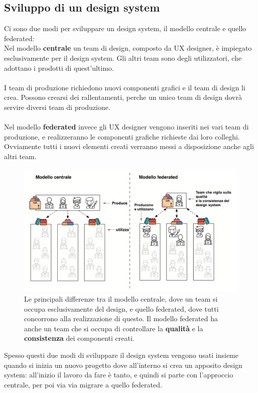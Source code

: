 \subsection{Sviluppo di un design system}
Ci sono due modi per sviluppare un design system, il modello centrale e quello federated:
\\
Nel modello \textbf{centrale} un team di design, composto da UX designer, è impiegato esclusivamente per il design system. Gli altri team sono degli utilizzatori, che adottano i
 prodotti di quest'ultimo.
\\\\
I team di produzione richiedono nuovi componenti grafici e il team di design li crea. 
Possono crearsi dei rallentamenti, perche un unico team di design dovrà servire diversi team di produzione.
\\\\
Nel modello \textbf{federated} invece gli UX designer vengono inseriti nei vari team di produzione, e realizzeranno le componenti grafiche richieste dai loro colleghi. 
Ovviamente tutti i nuovi elementi creati verranno messi a disposizione anche agli altri team.
\begin{figure}[H]
    \centering
    \includegraphics[width=148mm]{img/design system}
    \caption{Le principali differenze tra il modello centrale, dove un team si occupa esclusivamente del design, e
    quello federated, dove tutti concorrono alla realizzazione di questo. Il modello federated ha anche un team che si occupa di controllare la \textbf{qualità} e la 
    \textbf{consistenza} dei componenti creati.}
  \end{figure}
Spesso questi due modi di sviluppare il design system vengono usati insieme quando si inizia un nuovo progetto dove 
all'interno si crea un apposito design system: all’inizio il lavoro da fare
 è tanto, e quindi si parte con l’approccio centrale, per poi via via migrare a quello federated.